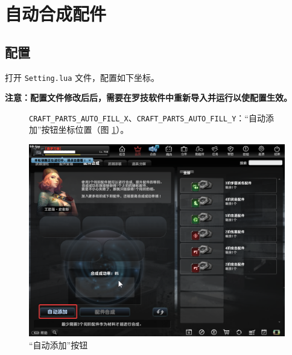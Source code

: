 \section{自动合成配件}

\subsection{配置}

打开 \lstinline{Setting.lua} 文件，配置如下坐标。

\textbf{\color{red}注意：配置文件修改后后，需要在罗技软件中重新导入并运行以使配置生效。}

\begin{figure}[H]
    \Centering
    \parbox[l]{\textwidth}{\lstinline{CRAFT_PARTS_AUTO_FILL_X}、\lstinline{CRAFT_PARTS_AUTO_FILL_Y}：“自动添加”按钮坐标位置（图 \ref{ch3fig-auto-fill}）。}
    \includegraphics[width=\textwidth]{docs/assets/auto_fill.png}
    \caption{“自动添加”按钮}
    \label{ch3fig-auto-fill}
\end{figure}

